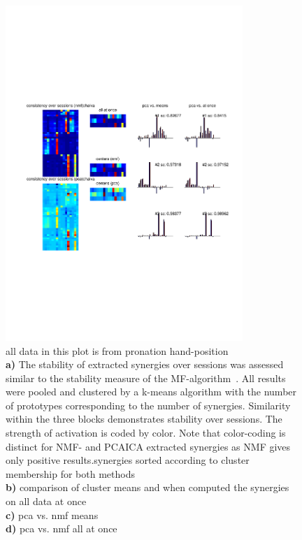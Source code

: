 \begin{figure}[ht]
    \centering
    \includegraphics[width=0.8\textwidth]{images/syn_consist_sessions_chalva.pdf}
    \caption{
    all data in this plot is from pronation hand-position\\
    \textbf{a)} The stability of extracted synergies over sessions was assessed similar to the stability measure of the MF-algorithm~. All results were pooled and clustered by a k-means algorithm with the number of prototypes corresponding to the number of synergies. Similarity within the three blocks demonstrates stability over sessions. The strength of activation is coded by color. Note that color-coding is distinct for NMF- and PCAICA extracted synergies as NMF gives only positive results.synergies sorted according to cluster membership for both methods\\
    \textbf{b)} comparison of cluster means and when computed the synergies on all data at once\\
    \textbf{c)} pca vs. nmf means\\
    \textbf{d)} pca vs. nmf all at once\\
    }
    \label{sg:fig:images_syn_consist_sessions_chalva}
\end{figure}

